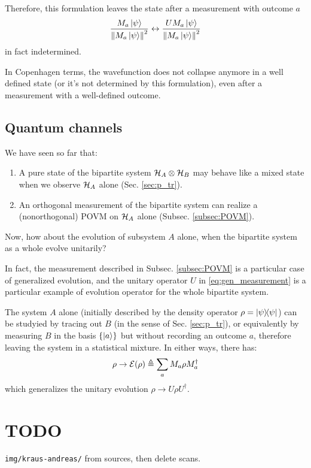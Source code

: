 Therefore, this formulation leaves the state after a measurement
with outcome $a$
\[
  \frac{M_a\ket{\psi}}{\norm{M_a\ket{\psi}}^2}
  \leftrightarrow
  \frac{UM_a\ket{\psi}}{\norm{M_a\ket{\psi}}^2}
\]
in fact indetermined.

In Copenhagen terms, the wavefunction does not collapse anymore
in a well defined state
(or it's not determined by this formulation),
even after a measurement with a
well-defined outcome.

\subsection{Quantum channels}

We have seen so far that:
\begin{enumerate}
\item
  A pure state of the bipartite system $\mathcal{H}_A\otimes\mathcal{H}_B$
  may behave like a mixed state when we observe $\mathcal{H}_A$ alone
  (Sec. \ref{sec:p_tr}).
\item
  An orthogonal measurement of the bipartite system can realize a
  (nonorthogonal) POVM on $\mathcal{H}_A$ alone (Subsec. \ref{subsec:POVM}).
\end{enumerate}
Now, how about the evolution of subsystem $A$ alone,
when the bipartite system as a whole evolve unitarily?

In fact, the measurement described in Subsec. \ref{subsec:POVM}
is a particular case of generalized evolution, and the unitary operator $U$
in \eqref{eq:gen_measurement} is a particular example of
evolution operator for the whole bipartite system.

The system $A$ alone
(initially described by the density operator $\rho=\ketbra{\psi}$)
can be studyied by tracing out $B$
(in the sense of Sec. \ref{sec:p_tr}),
or equivalently by measuring $B$ in the basis $\left\{\ket{a}\right\}$
but without recording an outcome $a$, therefore leaving the system
in a statistical mixture.
In either ways, there has:
\begin{equation}\label{eq:channel}
  \rho \rightarrow \mathcal{E}(\rho) \triangleq \sum_a M_a \rho M_a^{\dagger}
\end{equation}
which generalizes the unitary evolution $\rho \rightarrow U \rho U^{\dagger}$.





\iftodo
\section{TODO}
\texttt{img/kraus-andreas/} from sources,
then delete scans.
\fi
